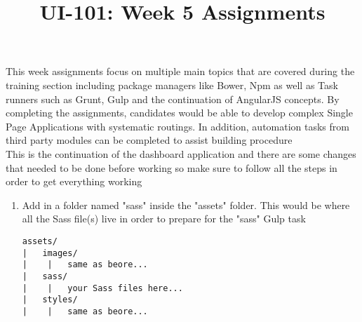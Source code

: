 \documentclass[12pt]{article}
\begin{document}
\title{UI-101: Week 5 Assignments}
\date{}
\author{}
\maketitle

\begin{flushleft}
This week assignments focus on multiple main topics that are covered during the training section including package managers like Bower, Npm as well as Task runners such as Grunt, Gulp and the continuation of AngularJS concepts. By completing the assignments, candidates would be able to develop complex Single Page Applications with systematic routings. In addition, automation tasks from third party modules can be completed to assist building procedure \\
\vspace{5mm}
This is the continuation of the dashboard application and there are some changes that needed to be done before working so make sure to follow all the steps in order to get everything working
\vspace{5mm}\\
\begin{enumerate}
	\item Add in a folder named "sass" inside the "assets" folder. This would be where all the Sass file(s) live in order to prepare for the "sass" Gulp task
	\begin{verbatim}
assets/
| 	images/
|	 |	 same as beore...
| 	sass/
|	 |	 your Sass files here...
| 	styles/
|	 |	 same as beore...
	\end{verbatim}	
\end{enumerate}
\end{flushleft}
\end{document}
